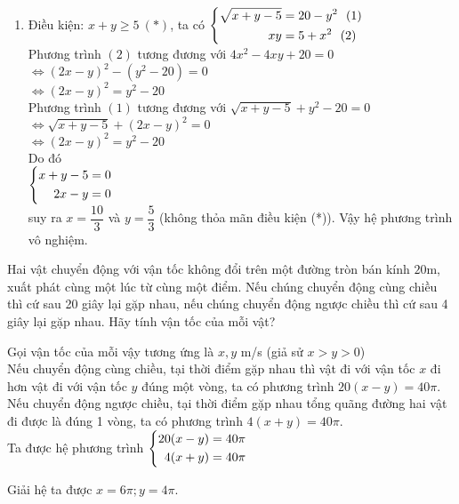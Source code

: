 \begin{ex}
{\begin{enumerate}
    \item  Điều kiện: $x+y \ge 5 \ (*)$, ta có $\heva{\sqrt{x+y-5}&=20-y^2 \ \ (1)\\ xy&=5+x^2 \ \ (2)}$\\
    Phương trình $(2)$ tương đương với $4x^2-4xy+20=0$ \\
    $ \Leftrightarrow (2x-y)^2-(y^2-20)=0$ \\
    $ \Leftrightarrow (2x-y)^2=y^2-20$\\
  Phương trình $(1)$ tương đương với $\sqrt{x+y-5}+y^2-20=0$ \\
  $ \Leftrightarrow \sqrt{x+y-5}+ (2x-y)^2=0$ \\
  $\Leftrightarrow (2x-y)^2=y^2-20$\\  
  Do đó \\
  $\left\{\begin{aligned}x+y-5&=0\\2x-y&=0\end{aligned}\right.$ 
  \\suy ra $x=\dfrac{10}{3}$ và $y=\dfrac{5}{3}$
   (không thỏa mãn điều kiện (*)). Vậy hệ phương trình vô nghiệm.
   \end{enumerate}
    }
\end{ex}

\begin{ex} %
    Hai vật chuyển động với vận tốc không đổi trên một đường tròn bán kính $20$m, xuất phát cùng một lúc từ cùng một điểm. Nếu chúng chuyển động cùng chiều thì cứ sau 20 giây lại gặp nhau, nếu chúng chuyển động ngược chiều thì cứ sau 4 giây lại gặp nhau. Hãy tính vận tốc của mỗi vật?
\loigiai
    {
    Gọi vận tốc của mỗi vậy tương ứng là $x,y$ m/s (giả sử $x>y>0$)\\
    Nếu chuyển động cùng chiều, tại thời điểm gặp nhau thì vật đi với vận tốc $x$ đi hơn vật đi với vận tốc $y$ đúng một vòng, ta có phương trình $20(x-y)=40\pi $.\\
    Nếu chuyển động ngược chiều, tại thời điểm gặp nhau tổng quãng đường hai vật đi được là đúng 1 vòng, ta có phương trình $4(x+y)=40\pi$.\\
    Ta được hệ phương trình $\left\{\begin{aligned}20(x-y)&=40\pi\\ 4(x+y)&=40\pi\end{aligned}\right.$
    
    Giải hệ ta được $x=6\pi; y=4\pi$.
    }
\end{ex}

